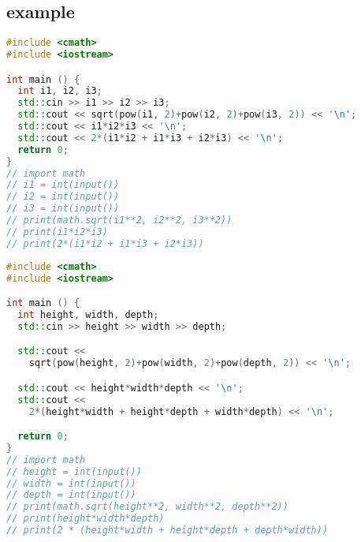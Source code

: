 \documentclass{beamer}
\begin{document}
\subsection{example}
\begin{frame}[fragile]
  \begin{lstlisting}[language=C++]
#include <cmath>
#include <iostream>

int main () {
  int i1, i2, i3;
  std::cin >> i1 >> i2 >> i3;
  std::cout << sqrt(pow(i1, 2)+pow(i2, 2)+pow(i3, 2)) << '\n';
  std::cout << i1*i2*i3 << '\n';
  std::cout << 2*(i1*i2 + i1*i3 + i2*i3) << '\n';
  return 0;
}
// import math
// i1 = int(input())
// i2 = int(input())
// i3 = int(input())
// print(math.sqrt(i1**2, i2**2, i3**2))
// print(i1*i2*i3)
// print(2*(i1*i2 + i1*i3 + i2*i3))\end{lstlisting}
\end{frame}
\begin{frame}[fragile]
  \begin{lstlisting}[language=C++]
#include <cmath>
#include <iostream>

int main () {
  int height, width, depth;
  std::cin >> height >> width >> depth;

  std::cout << 
    sqrt(pow(height, 2)+pow(width, 2)+pow(depth, 2)) << '\n';

  std::cout << height*width*depth << '\n';
  std::cout << 
    2*(height*width + height*depth + width*depth) << '\n';

  return 0;
}
// import math
// height = int(input())
// width = int(input())
// depth = int(input())
// print(math.sqrt(height**2, width**2, depth**2))
// print(height*width*depth)
// print(2 * (height*width + height*depth + depth*width))\end{lstlisting}
\end{frame}
\end{document}
